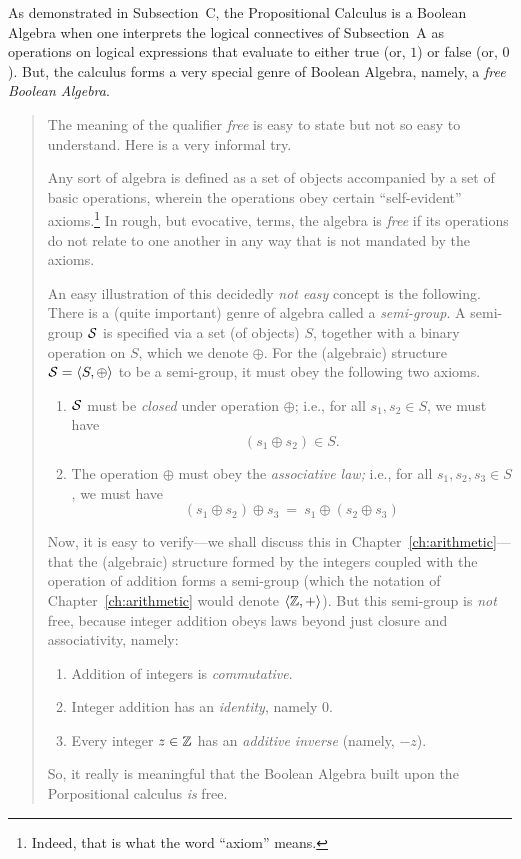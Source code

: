 \medskip

%
As demonstrated in Subsection~C, the Propositional Calculus is a
Boolean Algebra when one interprets the logical connectives of
Subsection~A as operations on logical expressions that evaluate to
either {\sc true} (or, $1$) or {\sc false} (or, $0$).  But, the
calculus forms a very special genre of Boolean Algebra, namely, a {\em
  free Boolean Algebra}.
\begin{quote}
The meaning of the qualifier {\it free} is easy to state but not so
easy to understand.  Here is a very informal try.

Any sort of algebra is defined as a set of objects accompanied by a
set of basic operations, wherein the operations obey certain
``self-evident'' 
axioms.\footnote{Indeed, that is what the word ``axiom'' means.}  In
rough, but evocative, terms, the algebra is {\em free} if its
operations do not relate to one another in any way that is not
mandated by the axioms.

An easy illustration of this decidedly {\em not easy} concept is the
following.  There is a (quite important) genre of algebra called a
{\it semi-group}. A semi-group $\mbox{$\cal S$}$ is specified via
a set (of objects) $S$, together with a binary operation on $S$, which
we denote $\oplus$.  For the (algebraic) structure $\mbox{$\cal S$} = \langle S,
\oplus \rangle$ to be a semi-group, it must obey the following two
axioms.
\begin{enumerate}
\item
$\mbox{$\cal S$}$ must be {\it closed} under operation $\oplus$; i.e., for all
  $s_1, s_2 \in S$, we must have
\[ (s_1 \oplus s_2) \in S. \]
\item
The operation $\oplus$ must obey the {\em associative law;}
i.e., for all $s_1, s_2, s_3 \in S$, we must have
\[ (s_1 \oplus s_2) \oplus s_3 \ = \ s_1 \oplus (s_2 \oplus s_3)
\]
\end{enumerate}

Now, it is easy to verify---we shall discuss this in
Chapter~\ref{ch:arithmetic}---that the (algebraic) structure formed by
the integers coupled with the operation of addition forms a semi-group
(which the notation of Chapter~\ref{ch:arithmetic} would denote
$\langle \mathbb{Z}, + \rangle$).  But this semi-group is {\em not}
free, because integer addition obeys laws beyond just closure and
associativity, namely:
\begin{enumerate}
\item
Addition of integers is {\em commutative}.
\item
Integer addition has an {\em identity}, namely $0$.
\item
Every integer $z \in \mathbb{Z}$ has an {\it additive inverse} (namely, $-z$).
\end{enumerate}

So, it really is meaningful that the Boolean Algebra built upon the
Porpositional calculus {\em is} free.
\end{quote}
